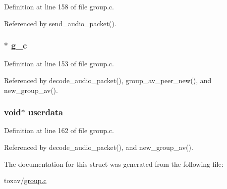 Definition at line 158 of file group.\+c.



Referenced by send\+\_\+audio\+\_\+packet().

\hypertarget{struct_group___a_v_a0220ceb497e4d7ffcbd301959cbfaf26}{
\subsubsection[{g\+\_\+c}]{$\ast$ g\+\_\+c}}\label{struct_group___a_v_a0220ceb497e4d7ffcbd301959cbfaf26}


Definition at line 153 of file group.\+c.



Referenced by decode\+\_\+audio\+\_\+packet(), group\+\_\+av\+\_\+peer\+\_\+new(), and new\+\_\+group\+\_\+av().

\hypertarget{struct_group___a_v_afd0ffb02780e738d4c0a10ab833b7834}{
\subsubsection[{userdata}]{\setlength{\rightskip}{0pt plus 5cm}void$\ast$ userdata}}\label{struct_group___a_v_afd0ffb02780e738d4c0a10ab833b7834}


Definition at line 162 of file group.\+c.



Referenced by decode\+\_\+audio\+\_\+packet(), and new\+\_\+group\+\_\+av().



The documentation for this struct was generated from the following file\+:\begin{DoxyCompactItemize}
\item 
toxav/\hyperlink{toxav_2group_8c}{group.\+c}\end{DoxyCompactItemize}

